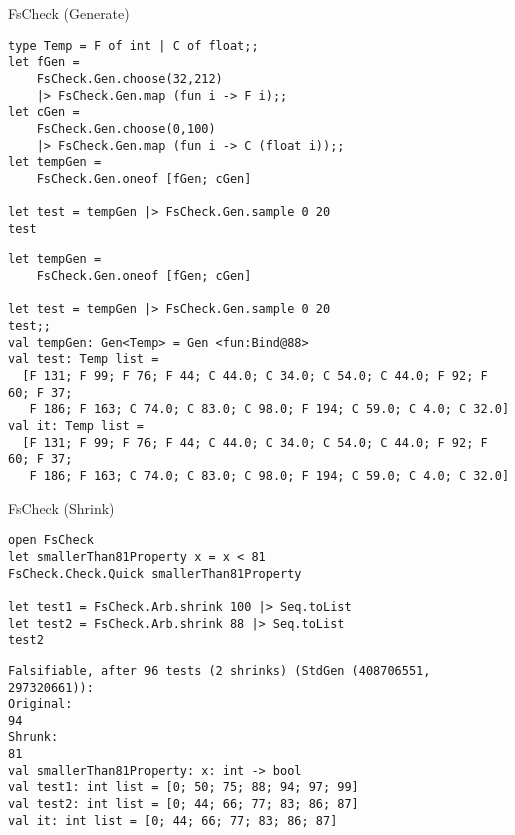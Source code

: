 \documentclass[t]{beamer}
\begin{document}
\begin{frame}[label={sec:org7d59835},fragile]{FsCheck (Generate)}
 \begin{verbatim}
type Temp = F of int | C of float;;
let fGen =
    FsCheck.Gen.choose(32,212)
    |> FsCheck.Gen.map (fun i -> F i);;
let cGen =
    FsCheck.Gen.choose(0,100)
    |> FsCheck.Gen.map (fun i -> C (float i));;
let tempGen =
    FsCheck.Gen.oneof [fGen; cGen]

let test = tempGen |> FsCheck.Gen.sample 0 20
test
\end{verbatim}

\begin{verbatim}
let tempGen =
    FsCheck.Gen.oneof [fGen; cGen]

let test = tempGen |> FsCheck.Gen.sample 0 20
test;;
val tempGen: Gen<Temp> = Gen <fun:Bind@88>
val test: Temp list =
  [F 131; F 99; F 76; F 44; C 44.0; C 34.0; C 54.0; C 44.0; F 92; F 60; F 37;
   F 186; F 163; C 74.0; C 83.0; C 98.0; F 194; C 59.0; C 4.0; C 32.0]
val it: Temp list =
  [F 131; F 99; F 76; F 44; C 44.0; C 34.0; C 54.0; C 44.0; F 92; F 60; F 37;
   F 186; F 163; C 74.0; C 83.0; C 98.0; F 194; C 59.0; C 4.0; C 32.0]
\end{verbatim}
\end{frame}

\begin{frame}[label={sec:org669b3c0},fragile]{FsCheck (Shrink)}
 \begin{verbatim}
open FsCheck
let smallerThan81Property x = x < 81
FsCheck.Check.Quick smallerThan81Property

let test1 = FsCheck.Arb.shrink 100 |> Seq.toList
let test2 = FsCheck.Arb.shrink 88 |> Seq.toList
test2
\end{verbatim}

\begin{verbatim}
Falsifiable, after 96 tests (2 shrinks) (StdGen (408706551, 297320661)):
Original:
94
Shrunk:
81
val smallerThan81Property: x: int -> bool
val test1: int list = [0; 50; 75; 88; 94; 97; 99]
val test2: int list = [0; 44; 66; 77; 83; 86; 87]
val it: int list = [0; 44; 66; 77; 83; 86; 87]
\end{verbatim}
\end{frame}
\end{document}

